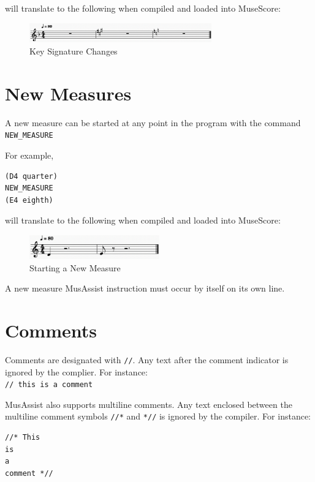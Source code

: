 \documentclass{report}
\begin{document}
will translate to the following when compiled and loaded into MuseScore:

\begin{figure}[h!]
\centering
\includegraphics[width=0.7\textwidth]{images/keys}
  \caption{Key Signature Changes}
\end{figure}
\newpage

\section{New Measures}
A new measure can be started at any point in the program with the command \verb.NEW_MEASURE.

For example,
\begin{verbatim}
(D4 quarter)
NEW_MEASURE
(E4 eighth)
\end{verbatim}

will translate to the following when compiled and loaded into MuseScore:

\begin{figure}[h!]
\centering
\includegraphics[width=0.5\textwidth]{images/newmeasure}
  \caption{Starting a New Measure}
\end{figure}

A new measure MusAssist instruction must occur by itself on its own line.

\section{Comments}
Comments are designated with \verb.//.. Any text after the comment indicator is ignored by the complier. For instance:\\ \verb.// this is a comment.

MusAssist also supports multiline comments. Any text enclosed between the multiline comment symbols \verb.//*. and \verb.*//. is ignored by the compiler. For instance:
\begin{verbatim}
//* This 
is 
a 
comment *//
\end{verbatim}
\end{document}
